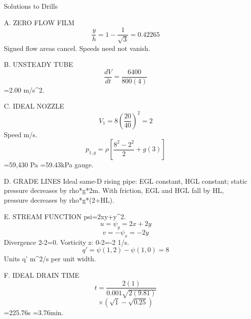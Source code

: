 Solutions to Drills

A. ZERO FLOW FILM
$$\frac{y}{h}=1-\frac{1}{\sqrt3}=0.42265$$
Signed flow areas cancel. Speeds need not vanish.

B. UNSTEADY TUBE
$$\frac{dV}{dt}=\frac{6400}{800(4)}$$
=2.00 m/s^2.

C. IDEAL NOZZLE
$$V_1=8(\frac{20}{40})^2=2$$
Speed m/s.
$$p_{1,g}=\rho[\frac{8^2-2^2}{2}+g(3)]$$
=59,430 Pa =59.43kPa gauge.

D. GRADE LINES
Ideal same-D rising pipe: EGL constant, HGL constant; static pressure decreases by rho*g*2m.
With friction, EGL and HGL fall by HL, pressure decreases by rho*g*(2+HL).

E. STREAM FUNCTION
psi=2xy+y^2.
$$u=\psi_y=2x+2y$$
$$v=-\psi_x=-2y$$
Divergence 2-2=0.
Vorticity z: 0-2=-2 1/s.
$$q'=\psi(1,2)-\psi(1,0)=8$$
Units q' m^2/s per unit width.

F. IDEAL DRAIN TIME
$$t=\frac{2(1)}{0.001\sqrt{2(9.81)}}$$
$$\times(\sqrt1-\sqrt{0.25})$$
=225.76s =3.76min.
